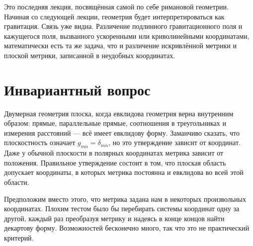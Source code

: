 \begin{classroomqa}\end{classroomqa}

Это последняя лекция, посвящённая самой по себе римановой геометрии. Начиная со следующей лекции, геометрия будет интерпретироваться как гравитация. Связь уже видна. Различение подлинного гравитационного поля и кажущегося поля, вызванного ускоренными или криволинейными координатами, математически есть та же задача, что и различение искривлённой метрики и плоской метрики, записанной в неудобных координатах.

\section{Инвариантный вопрос}

Двумерная геометрия плоска, когда евклидова геометрия верна внутренним образом: прямые, параллельные прямые, соотношения в треугольниках и измерения расстояний — всё имеет евклидову форму. Заманчиво сказать, что плоскостность означает \(g_{mn}=\delta_{mn}\), но это утверждение зависит от координат. Даже у обычной плоскости в полярных координатах метрика зависит от положения. Правильное утверждение состоит в том, что плоская область допускает координаты, в которых метрика постоянна и евклидова во всей этой области.

Предположим вместо этого, что метрика задана нам в некоторых произвольных координатах. Плохим тестом было бы перебирать системы координат одну за другой, каждый раз преобразуя метрику и надеясь в конце концов найти декартову форму. Возможностей бесконечно много, так что это не практический критерий.

